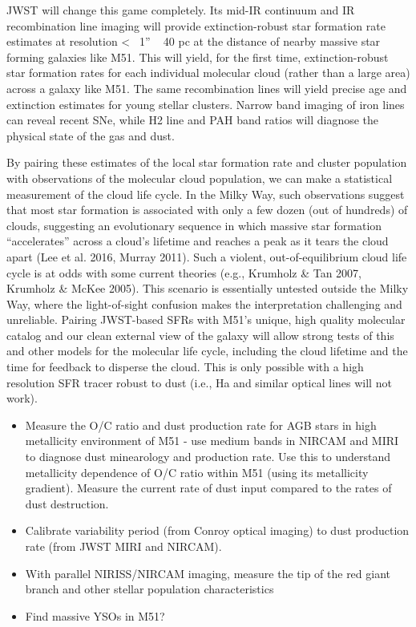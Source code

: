 \documentclass[12pt]{article}
\begin{document}
JWST will change this game completely. Its mid-IR continuum and IR recombination line imaging will provide extinction-robust star formation rate estimates at resolution <~ 1” ~ 40 pc at the distance of nearby massive star forming galaxies like M51. This will yield, for the first time, extinction-robust star formation rates for each individual molecular cloud (rather than a large area) across a galaxy like M51. The same recombination lines will yield precise age and extinction estimates for young stellar clusters. Narrow band imaging of iron lines can reveal recent SNe, while H2 line and PAH band ratios will diagnose the physical state of the gas and dust.

By pairing these estimates of the local star formation rate and cluster population with observations of the molecular cloud population, we can make a statistical measurement of the cloud life cycle. In the Milky Way, such observations suggest that most star formation is associated with only a few dozen (out of hundreds) of clouds, suggesting an evolutionary sequence in which massive star formation “accelerates” across a cloud’s lifetime and reaches a peak as it tears the cloud apart (Lee et al. 2016, Murray 2011). Such a violent, out-of-equilibrium cloud life cycle is at odds with some current theories (e.g., Krumholz \& Tan 2007, Krumholz \& McKee 2005). This scenario is essentially untested outside the Milky Way, where the light-of-sight confusion makes the interpretation challenging and unreliable. Pairing JWST-based SFRs with M51’s unique, high quality molecular catalog and our clean external view of the galaxy will allow strong tests of this and other models for the molecular life cycle, including the cloud lifetime and the time for feedback to disperse the cloud. This is only possible with a high resolution SFR tracer robust to dust (i.e., Ha and similar optical lines will not work).




\begin{itemize}
    \item{Measure the O/C ratio and dust production rate for AGB stars in high metallicity environment of M51 - use medium bands in NIRCAM and MIRI to diagnose dust minearology and production rate. Use this to understand metallicity dependence of O/C ratio within M51 (using its metallicity gradient).  Measure the current rate of dust input compared to the rates of dust destruction.}
    \item{Calibrate variability period (from Conroy optical imaging) to dust production rate (from JWST MIRI and NIRCAM).}
    \item{With parallel NIRISS/NIRCAM imaging, measure the tip of the red giant branch and other stellar population characteristics}
    \item{Find massive YSOs in M51?}
\end{itemize}
\end{document}
